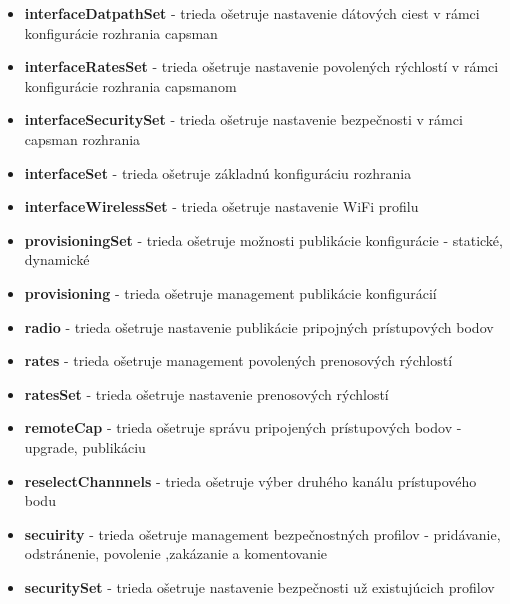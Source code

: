 \begin{itemize}
\item  \textbf{interfaceDatpathSet} - trieda ošetruje nastavenie dátových ciest v rámci konfigurácie rozhrania capsman
\item \textbf{interfaceRatesSet} - trieda ošetruje nastavenie povolených rýchlostí v rámci konfigurácie rozhrania capsmanom
\item  \textbf{interfaceSecuritySet} - trieda ošetruje nastavenie bezpečnosti v rámci capsman rozhrania
\item \textbf{interfaceSet} - trieda ošetruje základnú konfiguráciu rozhrania 
\item \textbf{interfaceWirelessSet} - trieda ošetruje nastavenie WiFi profilu
\item \textbf{provisioningSet} - trieda ošetruje možnosti publikácie konfigurácie - statické, dynamické
\item \textbf{provisioning} - trieda ošetruje management publikácie konfigurácií
\item \textbf{radio} -  trieda ošetruje nastavenie publikácie pripojných prístupových bodov
\item \textbf{rates} - trieda ošetruje management povolených prenosových rýchlostí
\item \textbf{ratesSet} - trieda ošetruje nastavenie prenosových rýchlostí
\item \textbf{remoteCap} - trieda ošetruje správu pripojených prístupových bodov - upgrade, publikáciu
\item \textbf{reselectChannnels} - trieda ošetruje výber druhého kanálu prístupového bodu
\item \textbf{secuirity} - trieda ošetruje management bezpečnostných profilov - pridávanie, odstránenie, povolenie ,zakázanie a komentovanie
\item \textbf{securitySet} - trieda ošetruje nastavenie bezpečnosti už existujúcich profilov
\end{itemize}
